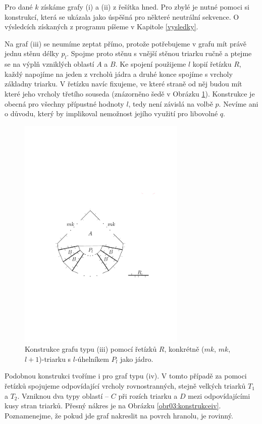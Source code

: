 Pro dané $k$ získáme grafy (i) a (ii) z řešítka hned. Pro zbylé je nutné pomoci si konstrukcí, která se ukázala jako úspěšná pro některé neutrální sekvence. O výsledcích získaných z programu píšeme v Kapitole \ref{vysledky}.

Na graf (iii) se neumíme zeptat přímo, protože potřebujeme v grafu mít právě jednu stěnu délky $p_l$. Spojme proto stěnu s vnější stěnou triarku ručně a ptejme se na výplň vzniklých oblastí $A$ a $B$. Ke spojení použijeme $l$ kopií řetízku $R$, každý napojíme na jeden z vrcholů jádra a druhé konce spojíme s  vrcholy základny triarku. V řetízku navíc fixujeme, ve které straně od něj budou mít které jeho vrcholy třetího souseda (znázorněno šedě v Obrázku \ref{obr03:konstrukceiii}). Konstrukce je obecná pro všechny přípustné hodnoty $l$, tedy není závislá na volbě $p$. Nevíme ani o důvodu, který by implikoval nemožnost jejího využití pro libovolné $q$.

\begin{figure}[h]\centering
\includegraphics[width = 80mm]{../img/iii-construction}
\caption{Konstrukce grafu typu (iii) pomocí řetízků $R$, konkrétně ($mk$, $mk$, $l+1$)-triarku s $l$-úhelníkem $P_l$ jako jádro.}
\label{obr03:konstrukceiii}
\end{figure}

Podobnou konstrukci tvoříme i pro graf typu (iv). V tomto případě za pomoci řetízků spojujeme odpovídající vrcholy rovnostranných, stejně velkých triarků $T_1$ a $T_2$. Vzniknou dva typy oblastí -- $C$ při rozích triarku a $D$ mezi odpovídajícími kusy stran triarků. Přesný nákres je na Obrázku \ref{obr03:konstrukceiv}. Poznamenejme, že pokud jde graf nakreslit na povrch hranolu, je rovinný. 

